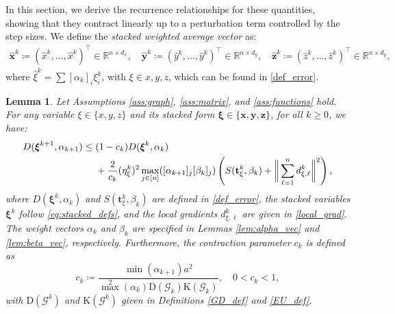 \documentclass{article}
\theoremstyle{plain}
\newtheorem{lemma}[theorem]{Lemma}
\theoremstyle{definition}
\theoremstyle{remark}
\begin{document}
In this section, we derive the recurrence relationships for these quantities, showing that they contract linearly up to a perturbation term controlled by the step sizes.
We define the \textit{stacked weighted average vector} as:
\begin{align}
    \mathbf{\hat{x}}^{k} \coloneqq (\hat{x}^{k}, \ldots, \hat{x}^{k}) ^\top\in \mathbb{R}^{n \times d_x},\quad \mathbf{\hat{y}}^{k} \coloneqq (\hat{y}^{k}, \ldots, \hat{y}^{k}) ^\top\in \mathbb{R}^{n \times d_y}
    ,\quad \mathbf{\hat{z}}^{k} \coloneqq (\hat{z}^{k}, \ldots, \hat{z}^{k})^\top \in \mathbb{R}^{n \times d_y},
\end{align}
where $\hat{\xi}^{k} = \sum [\alpha_{k}]_{i}\xi_{i}^{k}$, with $\xi \in {x, y, z}$, which can be found in \eqref{def_error}.
\begin{lemma}\label{lem:consensus_error_bound}
    Let Assumptions \ref{ass:graph}, \ref{ass:matrix}, and \ref{ass:functions} hold. For any variable $\xi \in \{x, y, z\}$ and its stacked form $\boldsymbol{\xi}\in\{\mathbf{x},\mathbf{y}, \mathbf{z}\}$, for all $k \ge 0$, we have:
    \begin{align}
        D(\boldsymbol{\xi}^{k+1}, \alpha_{k+1}) \leq{}& (1-c_{k} )D(\boldsymbol{\xi}^{k}, \alpha_{k}) \notag \\
            &+ \frac{2}{c_{k}}(\eta_{\xi}^{k})^{2} \max_{j\in[n]}([\alpha_{k+1}]_{j}[\beta_{k}]_{j}) \left( S(\mathbf{t}_{\xi}^{k}, \beta_{k}) + \bigg\| \sum_{\ell=1}^n d_{\xi,\ell}^k \bigg\|^{2} \right),
    \end{align}
    where $D(\boldsymbol{\xi}^{k}, \alpha_{k})$ and $S(\mathbf{t}_{\xi}^{k}, \beta_{k})$ are defined in \eqref{def_error}, the stacked variables $\boldsymbol{\xi}^k$ follow \eqref{eq:stacked_defs}, and the local gradients $d_{\xi,\ell}^k$ are given in \eqref{local_grad}. The weight vectors $\alpha_{k}$ and $\beta_{k}$ are specified in Lemmas \ref{lem:alpha_vec} and \ref{lem:beta_vec}, respectively. Furthermore, the contraction parameter $c_{k}$ is defined as
    \begin{equation*}
      c_{k} \coloneqq \frac{\min(\alpha_{k+1})a^{2}}{\max^{2}(\alpha_{k})\mathrm{D}(\mathcal{G}_{k})\mathrm{K}(\mathcal{G}_{k})} ,\quad 0<c_{k}<1,
    \end{equation*}
    with $\mathrm{D}(\mathcal{G}^{k})$ and $\mathrm{K}(\mathcal{G}^{k})$ given in Definitions \ref{GD_def} and \ref{EU_def}.
\end{lemma}
\end{document}
